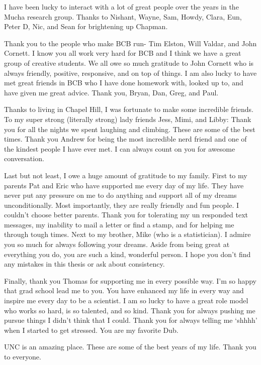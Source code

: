 I have been lucky to interact with a lot of great people over the years in the Mucha research group. Thanks to Nishant, Wayne, Sam, Howdy, Clara, Eun, Peter D, Nic, and Sean for brightening up Chapman.

Thank you to the people who make BCB run- Tim Elston, Will Valdar, and John Cornett. I know you all work very hard for BCB and I think we have a great group of creative students. We all owe so much gratitude to John Cornett who is always friendly, positive, responsive, and on top of things. I am also lucky to have met great friends in BCB who I have done homework with, looked up to, and have given me great advice. Thank you, Bryan, Dan, Greg, and Paul. 

Thanks to living in Chapel Hill, I was fortunate to make some incredible friends. To my super strong (literally strong) lady friends Jess, Mimi, and Libby: Thank you for all the nights we spent laughing and climbing. These are some of the best times. Thank you Andrew for being the most incredible nerd friend and one of the kindest people I have ever met. I can always count on you for awesome conversation. 

Last but not least, I owe a huge amount of gratitude to my family. First to my parents Pat and Eric who have supported me every day of my life. They have never put any pressure on me to do anything and support all of my dreams unconditionally. Most importantly, they are really friendly and fun people. I couldn't choose better parents. Thank you for tolerating my un responded text messages, my inability to mail a letter or find a stamp, and for helping me through tough times. Next to my brother, Mike (who is a statistician). I admire you so much for always following your dreams. Aside from being great at everything you do, you are such a kind, wonderful person. I hope you don't find any mistakes in this thesis or ask about consistency. 

Finally, thank you Thomas for supporting me in every possible way. I'm so happy that grad school lead me to you. You have enhanced my life in every way and inspire me every day to be a scientist. I am so lucky to have a great role model who works so hard, is so talented, and so kind. Thank you for always pushing me pursue things I didn't think that I could. Thank you for always telling me `shhhh' when I started to get stressed. You are my favorite Dub.

UNC is an amazing place. These are some of the best years of my life. Thank you to everyone.    

\clearpage
